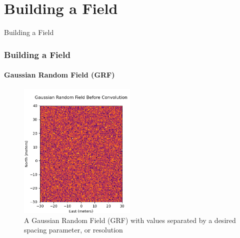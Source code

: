 \documentclass[professionalfont,10pt]{beamer}
\begin{document}
	\section{Building a Field}
	\begin{frame}[t]{Building a Field}
		\frametitle{Building a Field}
		\framesubtitle{Gaussian Random Field (GRF)}
		\hskip-0.75cm
		\begin{minipage}[t]{0.2\linewidth}\vspace{-0.5cm}
			\tiny\tableofcontents[currentsection,currentsubsection,hideothersubsections,subsectionstyle=show/shaded]
		\end{minipage}
		\hfill%
		\begin{minipage}[t]{0.86\linewidth}\vspace{-0.5cm}
			\begin{figure}[t]
				\centering
				\captionsetup{width=0.9\textwidth}
				\includegraphics[width=0.5\textwidth]{../images/GRFbeforeConv.png}
				\caption{A Gaussian Random Field (GRF) with values separated by a desired spacing parameter, or resolution}
				\label{CFandEncoder}
			\end{figure}
		\end{minipage}
		\vfill%
		
	\end{frame}
\end{document}
